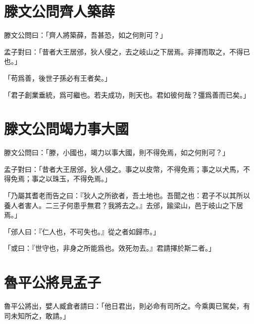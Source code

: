 \section{滕文公問齊人築薛}

滕文公問曰：「齊人將築薛，吾甚恐，如之何則可？」

孟子對曰：「昔者大王居邠，狄人侵之，去之岐山之下居焉。非擇而取之，不得已也。」

「苟爲善，後世子孫必有王者矣。」

「君子創業垂統，爲可繼也。若夫成功，則天也。君如彼何哉？彊爲善而已矣。」\par {}

\section{滕文公問竭力事大國}

滕文公問曰：「滕，小國也，竭力以事大國，則不得免焉，如之何則可？」

孟子對曰：「昔者大王居邠，狄人侵之。事之以皮幣，不得免焉；事之以犬馬，不得免焉；事之以珠玉，不得免焉。」

「乃屬其耆老而告之曰：『狄人之所欲者，吾土地也。吾聞之也：君子不以其所以養人者害人。二三子何患乎無君？我將去之。』去邠，踰梁山，邑于岐山之下居焉。」

「邠人曰：『仁人也，不可失也。』從之者如歸市。」

「或曰：『世守也，非身之所能爲也。效死勿去。』君請擇於斯二者。」\par {}

\section{魯平公將見孟子}

魯平公將出，嬖人臧倉者請曰：「他日君出，則必命有司所之。今乘輿已駕矣，有司未知所之，敢請。」

